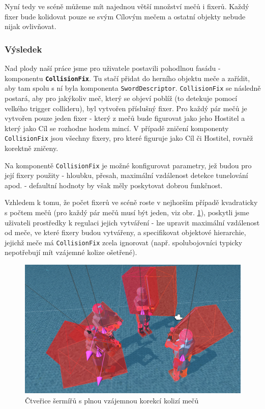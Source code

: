 Nyní tedy ve scéně můžeme mít najednou větší množství mečů i fixerů. Každý fixer bude kolidovat pouze se svým Cílovým mečem a ostatní objekty nebude nijak ovlivňovat.


\subsubsection*{Výsledek}

Nad plody naší práce jsme pro uživatele postavili pohodlnou fasádu - komponentu \textbf{\texttt{CollisionFix}}. Tu stačí přidat do herního objektu meče a zařídit, aby tam spolu s ní byla komponenta \texttt{SwordDescriptor}. \texttt{CollisionFix} se následně postará, aby pro jakýkoliv meč, který se objeví poblíž (to detekuje pomocí velkého trigger collideru), byl vytvořen příslušný fixer. Pro každý pár mečů je vytvořen pouze jeden fixer - který z mečů bude figurovat jako jeho Hostitel a který jako Cíl se rozhodne hodem mincí. V případě zničení komponenty \texttt{CollisionFix} jsou všechny fixery, pro které figuruje jako Cíl či Hostitel, rovněž korektně zničeny.

Na komponentě \texttt{CollisionFix} je možné konfigurovat parametry, jež budou pro její fixery použity - hloubku, přesah, maximální vzdálenost detekce tunelování apod. - defaultní hodnoty by však měly poskytovat dobrou funkčnost. 

Vzhledem k tomu, že počet fixerů ve scéně roste v nejhorším případě kvadraticky s počtem mečů (pro každý pár mečů musí být jeden, viz obr. \ref{obr05:collisionFixGroup}), poskytli jsme uživateli prostředky k regulaci jejich vytváření - lze upravit maximální vzdálenost od meče, ve které fixery budou vytvářeny, a specifikovat objektové hierarchie, jejichž meče má \texttt{CollisionFix} zcela ignorovat (např. spolubojovníci typicky nepotřebují mít vzájemné kolize ošetřené).

\begin{figure}[ht]\centering
  \center
  \includegraphics[width=140mm]{../img/collisionFix-group.png}
  \caption{Čtveřice šermířů s plnou vzájemnou korekcí kolizí mečů}
  \label{obr05:collisionFixGroup}
\end{figure} 



